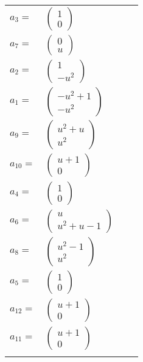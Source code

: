 \documentclass[1p]{elsarticle_modified}
\theoremstyle{definition}
\begin{document}
\begin{tabular}{m{7pt} m{180pt} m{7pt} m{180pt} }
\flushright $a_{3}=$&$\begin{pmatrix}1\\0\end{pmatrix}$ \\
\flushright $a_{7}=$&$\begin{pmatrix}0\\u\end{pmatrix}$ \\
\flushright $a_{2}=$&$\begin{pmatrix}1\\- u^2\end{pmatrix}$ \\
\flushright $a_{1}=$&$\begin{pmatrix}- u^2+1\\- u^2\end{pmatrix}$ \\
\flushright $a_{9}=$&$\begin{pmatrix}u^2+u\\u^2\end{pmatrix}$ \\
\flushright $a_{10}=$&$\begin{pmatrix}u+1\\0\end{pmatrix}$ \\
\flushright $a_{4}=$&$\begin{pmatrix}1\\0\end{pmatrix}$ \\
\flushright $a_{6}=$&$\begin{pmatrix}u\\u^2+u-1\end{pmatrix}$ \\
\flushright $a_{8}=$&$\begin{pmatrix}u^2-1\\u^2\end{pmatrix}$ \\
\flushright $a_{5}=$&$\begin{pmatrix}1\\0\end{pmatrix}$ \\
\flushright $a_{12}=$&$\begin{pmatrix}u+1\\0\end{pmatrix}$ \\
\flushright $a_{11}=$&$\begin{pmatrix}u+1\\0\end{pmatrix}$\\&\end{tabular}
\end{document}
